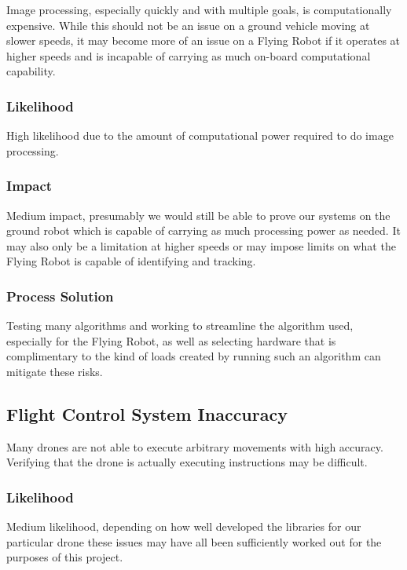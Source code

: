 \documentclass{article}
\begin{document}
	Image processing, especially quickly and with multiple goals, is computationally expensive. While this should not be an issue on a ground vehicle moving at slower speeds, it may become more of an issue on a Flying Robot if it operates at higher speeds and is incapable of carrying as much on-board computational capability.
	
		\subsubsection{Likelihood}

		High likelihood due to the amount of computational power required to do image processing. 
		
		\subsubsection{Impact}
		
		Medium impact, presumably we would still be able to prove our systems on the ground robot which is capable of carrying as much processing power as needed. It may also only be a limitation at higher speeds or may impose limits on what the Flying Robot is capable of identifying and tracking. 
		
		\subsubsection{Process Solution}
		
		Testing many algorithms and working to streamline the algorithm used, especially for the Flying Robot, as well as selecting hardware that is complimentary to the kind of loads created by running such an algorithm can mitigate these risks. 
	
	\subsection{Flight Control System Inaccuracy}
	
	Many drones are not able to execute arbitrary movements with high accuracy. Verifying that the drone is actually executing instructions may be difficult. 
	
		\subsubsection{Likelihood}
		
		Medium likelihood, depending on how well developed the libraries for our particular drone these issues may have all been sufficiently worked out for the purposes of this project.
		
\end{document}

